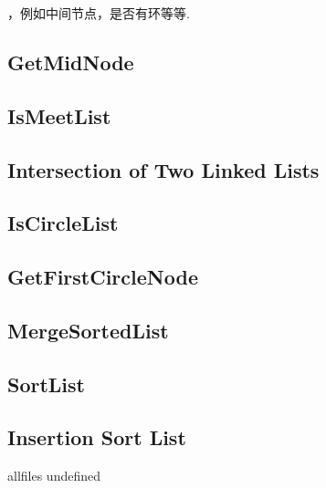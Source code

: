 \documentclass{article}
\begin{document}
\begin{CJK}{UTF8}{gbsn}     %

\else
    
，例如中间节点，是否有环等等.
\subsection{GetMidNode}

\subsection{IsMeetList}

\subsection{Intersection of Two Linked Lists}

\subsection{IsCircleList}

\subsection{GetFirstCircleNode}

\subsection{MergeSortedList}

\subsection{SortList}

\subsection{Insertion Sort List}


\fi

\ifx allfiles undefined
\end{CJK}
\end{document}
